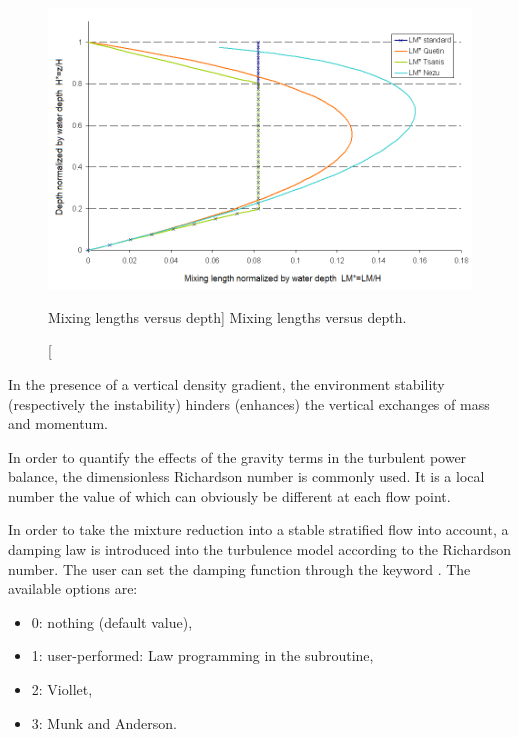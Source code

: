 \begin{figure}[H]%
\begin{center}
%
  \includegraphics[width=\textwidth]{./graphics/mixing_lengths}
%
\end{center}
\caption
[Mixing lengths versus depth]
{Mixing lengths versus depth.}
\label{fig:mix_len}
\end{figure}

In the presence of a vertical density gradient, the environment stability
(respectively the instability) hinders (enhances) the vertical exchanges of
mass and momentum.

In order to quantify the effects of the gravity terms in the turbulent power
balance, the dimensionless Richardson number is commonly used. It is a local
number the value of which can obviously be different at each flow point.

In order to take the mixture reduction into a stable stratified flow into
account, a damping law is introduced into the turbulence model according to the
Richardson number. The user can set the damping function through the keyword
. The available options are:

\begin{itemize}
\item  0: nothing (default value),

\item  1: user-performed: Law programming in the  subroutine,

\item  2: Viollet,

\item  3: Munk and Anderson.
\end{itemize}

